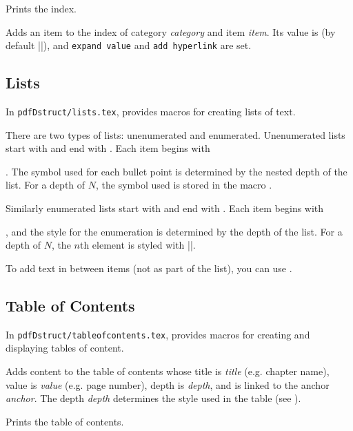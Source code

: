 \macroexp{\index}
Prints the index.
\emacroexp

Adds an item to the index of category {\it category} and item {\it item}.
Its value is \macro\@defaultindexval{} (by default \inlinecode|\the\pageno|), and {\tt expand value} and {\tt add hyperlink} are set.
\emacroexp

\subsection{Lists}

In {\tt pdfDstruct/lists.tex}, \pdftoolbox{} provides macros for creating lists of text.

There are two types of lists: unenumerated and enumerated.
Unenumerated lists start with \macro\blist\anchormacro\blist{} and end with \macro\elist\anchormacro\elist.
Each item begins with \macro\item\anchormacro\item.
The symbol used for each bullet point is determined by the nested depth of the list.
For a depth of $N$, the symbol used is stored in the macro \macro\liststyleN\anchormacro\liststyle.

Similarly enumerated lists start with \macro\benum\anchormacro\benum{} and end with \macro\elist\anchormacro\eenum.
Each item begins with \macro\item, and the style for the enumeration is determined by the depth of the list.
For a depth of $N$, the $n$th element is styled with \inlinecode||.

To add text in between items (not as part of the list), you can use \macro\mtext\anchormacro\mtext.

\subsection{Table of Contents}

In {\tt pdfDstruct/tableofcontents.tex}, \pdftoolbox{} provides macros for creating and displaying tables of content.

Adds content to the table of contents whose title is {\it title} (e.g. chapter name), value is {\it value} (e.g. page number), depth is {\it depth}, and is linked to the anchor {\it anchor}.
The depth {\it depth} determines the style used in the table (see \gotomacro\settocdepthformat).
\emacroexp

\macroexp{\tableofcontents}
Prints the table of contents.
\emacroexp

